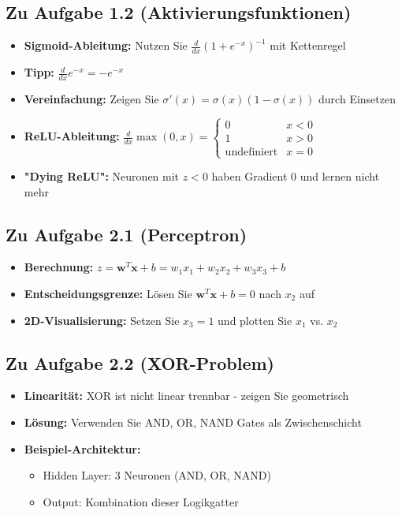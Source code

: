﻿\documentclass[12pt,a4paper]{article}
\begin{document}
\subsection*{Zu Aufgabe 1.2 (Aktivierungsfunktionen)}
\begin{itemize}
    \item \textbf{Sigmoid-Ableitung:} Nutzen Sie $\frac{d}{dx}(1 + e^{-x})^{-1}$ mit Kettenregel
    \item \textbf{Tipp:} $\frac{d}{dx}e^{-x} = -e^{-x}$
    \item \textbf{Vereinfachung:} Zeigen Sie $\sigma'(x) = \sigma(x)(1-\sigma(x))$ durch Einsetzen
    \item \textbf{ReLU-Ableitung:} $\frac{d}{dx}\max(0,x) = \begin{cases} 0 & x < 0 \\ 1 & x > 0 \\ \text{undefiniert} & x = 0 \end{cases}$
    \item \textbf{"Dying ReLU":} Neuronen mit $z < 0$ haben Gradient 0 und lernen nicht mehr
\end{itemize}

\subsection*{Zu Aufgabe 2.1 (Perceptron)}
\begin{itemize}
    \item \textbf{Berechnung:} $z = \mathbf{w}^T \mathbf{x} + b = w_1 x_1 + w_2 x_2 + w_3 x_3 + b$
    \item \textbf{Entscheidungsgrenze:} Lösen Sie $\mathbf{w}^T \mathbf{x} + b = 0$ nach $x_2$ auf
    \item \textbf{2D-Visualisierung:} Setzen Sie $x_3 = 1$ und plotten Sie $x_1$ vs. $x_2$
\end{itemize}

\subsection*{Zu Aufgabe 2.2 (XOR-Problem)}
\begin{itemize}
    \item \textbf{Linearität:} XOR ist nicht linear trennbar - zeigen Sie geometrisch
    \item \textbf{Lösung:} Verwenden Sie AND, OR, NAND Gates als Zwischenschicht
    \item \textbf{Beispiel-Architektur:} 
    \begin{itemize}
        \item Hidden Layer: 3 Neuronen (AND, OR, NAND)
        \item Output: Kombination dieser Logikgatter
    \end{itemize}
\end{itemize}
\end{document}
